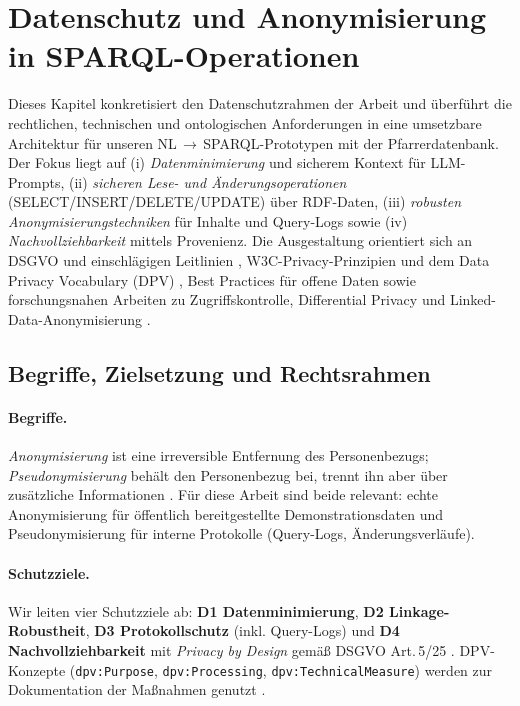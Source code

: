 \section{Datenschutz und Anonymisierung in SPARQL-Operationen}
\label{sec:Datenschutz und Anonymisierung in SPARQL-Operationen}

Dieses Kapitel konkretisiert den Datenschutzrahmen der Arbeit und überführt die rechtlichen, technischen und ontologischen Anforderungen in eine umsetzbare Architektur für unseren NL\,$\rightarrow$\,SPARQL-Prototypen mit der Pfarrerdatenbank. Der Fokus liegt auf (i) \emph{Datenminimierung} und sicherem Kontext für LLM-Prompts, (ii) \emph{sicheren Lese- und Änderungsoperationen} (SELECT/INSERT/DELETE/UPDATE) über RDF-Daten, (iii) \emph{robusten Anonymisierungstechniken} für Inhalte und Query-Logs sowie (iv) \emph{Nachvollziehbarkeit} mittels Provenienz. Die Ausgestaltung orientiert sich an DSGVO und einschlägigen Leitlinien \cite{eu2016gdpr,wp29_anonymisation_2014,enisa_pseudonymisation_2019}, W3C-Privacy-Prinzipien und dem Data Privacy Vocabulary (DPV) \cite{w3c_privacy_principles,dpv_w3c_note}, Best Practices für offene Daten \cite{w3c_dwbp_2017} sowie forschungsnahen Arbeiten zu Zugriffskontrolle, Differential Privacy und Linked-Data-Anonymisierung \cite{kirrane2018access_control_rdf_survey,buil_aranda_dp_sparql,delanaux_rdf_graph_anonymization_linkage,cuenca_kostylev_logical_foundations_ppdp_ld}.

\subsection{Begriffe, Zielsetzung und Rechtsrahmen}
\label{subsec:datenschutz-begriffe}

\paragraph{Begriffe.}
\emph{Anonymisierung} ist eine irreversible Entfernung des Personenbezugs; \emph{Pseudonymisierung} behält den Personenbezug bei, trennt ihn aber über zusätzliche Informationen \cite{wp29_anonymisation_2014,enisa_pseudonymisation_2019}. Für diese Arbeit sind beide relevant: echte Anonymisierung für öffentlich bereitgestellte Demonstrationsdaten und Pseudonymisierung für interne Protokolle (Query-Logs, Änderungsverläufe).

\paragraph{Schutzziele.}
Wir leiten vier Schutzziele ab: \textbf{D1 Datenminimierung}, \textbf{D2 Linkage-Robustheit}, \textbf{D3 Protokollschutz} (inkl. Query-Logs) und \textbf{D4 Nachvollziehbarkeit} mit \emph{Privacy by Design} gemäß DSGVO Art.\,5/25 \cite{eu2016gdpr,w3c_privacy_principles,w3c_dwbp_2017}. DPV-Konzepte (\texttt{dpv:Purpose}, \texttt{dpv:Processing}, \texttt{dpv:TechnicalMeasure}) werden zur Dokumentation der Maßnahmen genutzt \cite{dpv_w3c_note}.

